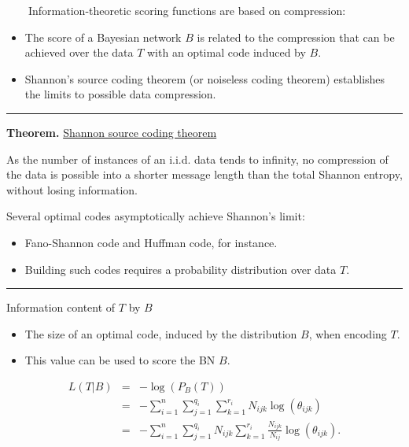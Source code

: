 ~~~~Information-theoretic scoring functions are based on compression:

\begin{itemize}
	\item The score of a Bayesian network $B$ is related to the compression that can be achieved over the data $T$ with an optimal code induced by $B$.
	
	\item Shannon’s source coding theorem (or noiseless coding theorem) establishes the limits to possible data compression.
\end{itemize}


\begin{center}\rule[0.5ex]{0.9\columnwidth}{1pt}\end{center}

\textbf{Theorem.} \underline{Shannon source coding theorem}

As the number of instances of an i.i.d. data tends to infinity, no compression of the data is possible into a shorter message length than the total Shannon entropy, without losing information.

Several optimal codes asymptotically achieve Shannon’s limit:

\begin{itemize}
	\item Fano-Shannon code and Huffman code, for instance.
	
	\item Building such codes requires a probability distribution over data $T$.
\end{itemize}

\begin{center}\rule[0.5ex]{0.9\columnwidth}{1pt}\end{center}

Information content of $T$ by $B$

\begin{itemize}
	\item The size of an optimal code, induced by the distribution $B$, when encoding $T$.
	
	\item This value can be used to score the BN $B$.
\end{itemize}

\begin{eqnarray*}
L(T|B) & = & -\log(P_{B}(T))\\
 & = & -\sum_{i=1}^{n}\sum_{j=1}^{q_{i}}\sum_{k=1}^{r_{i}}N_{ijk}\log(\theta_{ijk})\\
 & = & -\sum_{i=1}^{n}\sum_{j=1}^{q_{i}}N_{ijk}\sum_{k=1}^{r_{i}}\frac{N_{ijk}}{N_{ij}}\log(\theta_{ijk}).
\end{eqnarray*}



